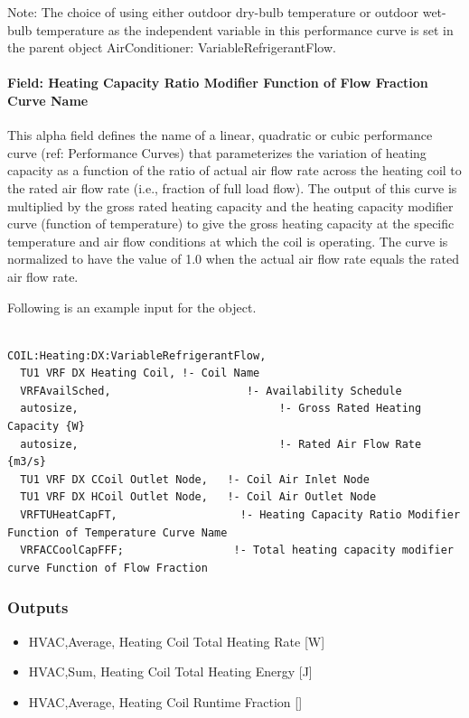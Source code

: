 Note: The choice of using either outdoor dry-bulb temperature or outdoor wet-bulb temperature as the independent variable in this performance curve is set in the parent object AirConditioner: VariableRefrigerantFlow.

\paragraph{Field: Heating Capacity Ratio Modifier Function of Flow Fraction Curve Name}\label{field-heating-capacity-ratio-modifier-function-of-flow-fraction-curve-name}

This alpha field defines the name of a linear, quadratic or cubic performance curve (ref: Performance Curves) that parameterizes the variation of heating capacity as a function of the ratio of actual air flow rate across the heating coil to the rated air flow rate (i.e., fraction of full load flow). The output of this curve is multiplied by the gross rated heating capacity and the heating capacity modifier curve (function of temperature) to give the gross heating capacity at the specific temperature and air flow conditions at which the coil is operating. The curve is normalized to have the value of 1.0 when the actual air flow rate equals the rated air flow rate.

Following is an example input for the object.

\begin{lstlisting}

COIL:Heating:DX:VariableRefrigerantFlow,
  TU1 VRF DX Heating Coil, !- Coil Name
  VRFAvailSched,                     !- Availability Schedule
  autosize,                               !- Gross Rated Heating Capacity {W}
  autosize,                               !- Rated Air Flow Rate {m3/s}
  TU1 VRF DX CCoil Outlet Node,   !- Coil Air Inlet Node
  TU1 VRF DX HCoil Outlet Node,   !- Coil Air Outlet Node
  VRFTUHeatCapFT,                   !- Heating Capacity Ratio Modifier Function of Temperature Curve Name
  VRFACCoolCapFFF;                 !- Total heating capacity modifier curve Function of Flow Fraction
\end{lstlisting}

\subsubsection{Outputs}\label{outputs-6-003}

\begin{itemize}
\item
  HVAC,Average, Heating Coil Total Heating Rate {[}W{]}
\item
  HVAC,Sum, Heating Coil Total Heating Energy {[}J{]}
\item
  HVAC,Average, Heating Coil Runtime Fraction {[]}
\end{itemize}


